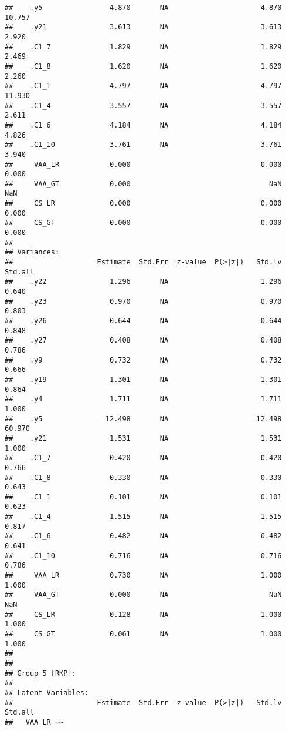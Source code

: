 \documentclass[
]{article}
\begin{document}
\begin{verbatim}
##    .y5                4.870       NA                      4.870   10.757
##    .y21               3.613       NA                      3.613    2.920
##    .C1_7              1.829       NA                      1.829    2.469
##    .C1_8              1.620       NA                      1.620    2.260
##    .C1_1              4.797       NA                      4.797   11.930
##    .C1_4              3.557       NA                      3.557    2.611
##    .C1_6              4.184       NA                      4.184    4.826
##    .C1_10             3.761       NA                      3.761    3.940
##     VAA_LR            0.000                               0.000    0.000
##     VAA_GT            0.000                                 NaN      NaN
##     CS_LR             0.000                               0.000    0.000
##     CS_GT             0.000                               0.000    0.000
## 
## Variances:
##                    Estimate  Std.Err  z-value  P(>|z|)   Std.lv  Std.all
##    .y22               1.296       NA                      1.296    0.640
##    .y23               0.970       NA                      0.970    0.803
##    .y26               0.644       NA                      0.644    0.848
##    .y27               0.408       NA                      0.408    0.786
##    .y9                0.732       NA                      0.732    0.666
##    .y19               1.301       NA                      1.301    0.864
##    .y4                1.711       NA                      1.711    1.000
##    .y5               12.498       NA                     12.498   60.970
##    .y21               1.531       NA                      1.531    1.000
##    .C1_7              0.420       NA                      0.420    0.766
##    .C1_8              0.330       NA                      0.330    0.643
##    .C1_1              0.101       NA                      0.101    0.623
##    .C1_4              1.515       NA                      1.515    0.817
##    .C1_6              0.482       NA                      0.482    0.641
##    .C1_10             0.716       NA                      0.716    0.786
##     VAA_LR            0.730       NA                      1.000    1.000
##     VAA_GT           -0.000       NA                        NaN      NaN
##     CS_LR             0.128       NA                      1.000    1.000
##     CS_GT             0.061       NA                      1.000    1.000
## 
## 
## Group 5 [RKP]:
## 
## Latent Variables:
##                    Estimate  Std.Err  z-value  P(>|z|)   Std.lv  Std.all
##   VAA_LR =~                                                             

\end{verbatim}
\end{document}
